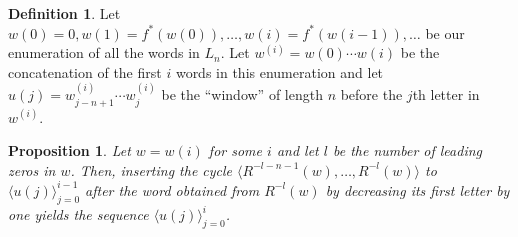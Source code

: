 \documentclass{article}
\newtheorem{proposition}[theorem]{Proposition}
\theoremstyle{definition}
\newtheorem{definition}{Definition}
\newcommand{\T}[1]{\langle{#1}\rangle}
\begin{document}
\begin{definition}
	Let $w(0)=0, w(1)=f^*(w(0)),\dots,w(i)=f^*(w{(i-1)}),\dots$ be our enumeration of all the words in $L_n$. Let $w^{(i)}=w(0)\cdots w(i)$ be the concatenation of the first $i$ words in this enumeration and let $u(j)=w^{(i)}_{j-n+1}\cdots w^{(i)}_j$ be the ``window'' of length $n$ before the $j$th letter in $w^{(i)}$.
\end{definition}

\begin{proposition}
	Let $w=w(i)$ for some $i$ and let $l$ be the number of leading zeros in $w$.
	Then, inserting the cycle $\T{R^{-l-n-1}(w),\dots,R^{-l}(w)}$ to $\T{u(j)}_{j=0}^{i-1}$
	 after the word obtained from $R^{-l}(w)$ by decreasing its first letter by one
	 yields the sequence $\T{u(j)}_{j=0}^{i}$.
\end{proposition}		
	
		
\end{document}
